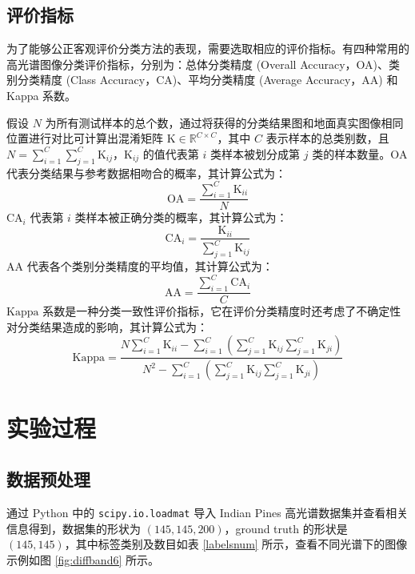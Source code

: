 \documentclass[12pt,AutoFakeBold]{article}
\begin{document}
\subsection{评价指标}

为了能够公正客观评价分类方法的表现，需要选取相应的评价指标。有四种常用的高光谱图像分类评价指标，分别为：总体分类精度 (Overall Accuracy，OA)、类别分类精度 (Class Accuracy，CA)、平均分类精度 (Average Accuracy，AA) 和 Kappa 系数。

假设 $N$ 为所有测试样本的总个数，通过将获得的分类结果图和地面真实图像相同位置进行对比可计算出混淆矩阵 $\mathrm{K}\in\mathbb{R}^{C\times C}$，其中 $C$ 表示样本的总类别数，且 $N=\sum_{i=1}^C\sum_{j=1}^C\mathrm{K}_{ij}$，$\mathrm{K}_{ij}$ 的值代表第 $i$ 类样本被划分成第 $j$ 类的样本数量。$\mathrm{OA}$ 代表分类结果与参考数据相吻合的概率，其计算公式为：
%
\begin{equation}
\mathrm{OA}=\frac{\displaystyle\sum_{i=1}^C\mathrm{K}_{ii}}{N}
\end{equation}
%
$\mathrm{CA}_i$ 代表第 $i$ 类样本被正确分类的概率，其计算公式为：
%
\begin{equation}
\mathrm{CA}_i=\frac{\mathrm{K}_{ii}}{\displaystyle\sum_{j=1}^C\mathrm{K}_{ij}}
\end{equation}
%
$\mathrm{AA}$ 代表各个类别分类精度的平均值，其计算公式为：
%
\begin{equation}
\mathrm{AA}=\frac{\displaystyle\sum_{i=1}^C\mathrm{CA}_i}{C}
\end{equation}
%
$\mathrm{Kappa}$ 系数是一种分类一致性评价指标，它在评价分类精度时还考虑了不确定性对分类结果造成的影响，其计算公式为：
%
\begin{equation}
\mathrm{Kappa}=\frac{N\displaystyle\sum_{i=1}^C\mathrm{K}_{ii}-\sum_{i=1}^C\left(\sum_{j=1}^C\mathrm{K}_{ij}\sum_{j=1}^C\mathrm{K}_{ji}\right)}{N^2-\displaystyle\sum_{i=1}^C\left(\sum_{j=1}^C\mathrm{K}_{ij}\sum_{j=1}^C\mathrm{K}_{ji}\right)}
\end{equation}
%

\section{实验过程}


\subsection{数据预处理}

通过 Python 中的 \lstinline[language=Python]|scipy.io.loadmat| 导入 Indian Pines 高光谱数据集并查看相关信息得到，数据集的形状为 $(145,145,200)$，ground truth 的形状是 $(145, 145)$，其中标签类别及数目如表 \ref{labelsnum} 所示，查看不同光谱下的图像示例如图 \ref{fig:diffband6} 所示。
\end{document}
